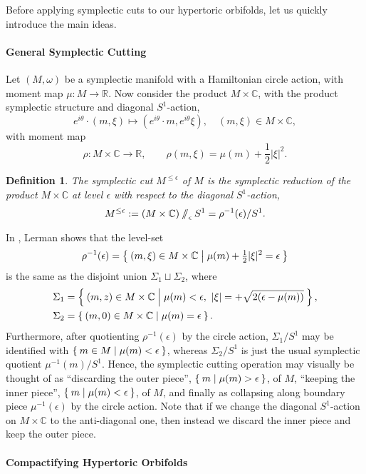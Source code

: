 \documentclass{amsart}
\newtheorem{defn}[theorem]{Definition\rm}
\newcommand{\ra}{\rightarrow}
\newcommand{\w}{\omega}
\newcommand{\e}{\epsilon}
\newcommand{\RR}{\mathbb{R}}
\newcommand{\CC}{\mathbb{C}}
\newcommand{\sslash}{\mathbin{/\mkern-6mu/}}
\begin{document}
	Before applying symplectic cuts to our hypertoric orbifolds, let us quickly introduce the main ideas.
	
	\paragraph{General Symplectic Cutting}
	
	Let $(M,\w)$ be a symplectic manifold with a Hamiltonian circle action, with moment map $\mu : M \ra \RR$. Now consider the product $M \times \CC$, with the product symplectic structure and diagonal $S^{1}$-action,
	\[
		e^{i\theta} \cdot (m, \xi) \longmapsto (e^{i\theta} \cdot m, e^{i\theta}\xi), \quad (m,\xi) \in M \times \CC,
	\]
	with moment map
	\[
		\rho : M \times \CC \ra \RR, \qquad \rho(m,\xi) = \mu(m) + \frac{1}{2}|\xi|^{2}.
	\]
	
	\begin{defn}
		The \emph{symplectic cut} $M^{\leq\e}$ of $M$ is the symplectic reduction of the product $M \times \CC$ at level $\e$ with respect to the diagonal $S^{1}$-action,
		\[
			M^{\leq\e} := (M \times \CC) \sslash_{\e} S^{1} = \rho^{-1}(\e)/S^{1}.
		\]
	\end{defn}
	
	In \cite{Ler95}, Lerman shows that the level-set
	\[
		\rho^{-1}(\e) = \Set{(m, \xi) \in M \times \CC | \mu(m) + \tfrac{1}{2}|\xi|^{2} = \e}
	\]
	is the same as the disjoint union $\Sigma_{1} \sqcup \Sigma_{2}$, where
	\begin{align*}
		\Sigma_{1} &= \Set{(m,z) \in M \times \CC | \mu(m) < \e,\ |\xi| = + \sqrt{2(\e - \mu(m))} }, \\
		\Sigma_{2} &= \Set{(m,0) \in M \times \CC | \mu(m) = \e}.
	\end{align*}
	Furthermore, after quotienting $\rho^{-1}(\e)$ by the circle action, $\Sigma_{1}/S^{1}$ may be identified with $\Set{m \in M | \mu(m) < \e}$, whereas $\Sigma_{2}/S^{1}$ is just the usual symplectic quotient $\mu^{-1}(m)/S^{1}$. Hence, the symplectic cutting operation may visually be thought of as ``discarding the outer piece'', $\Set{m | \mu(m) > \e}$, of $M$, ``keeping the inner piece'', $\Set{ m | \mu(m) < \e}$, of $M$, and finally as collapsing along boundary piece $\mu^{-1}(\e)$ by the circle action. Note that if we change the diagonal $S^{1}$-action on $M \times \CC$ to the anti-diagonal one, then instead we discard the inner piece and keep the outer piece.
	
	
	
	\paragraph{Compactifying Hypertoric Orbifolds}
	
\end{document}
